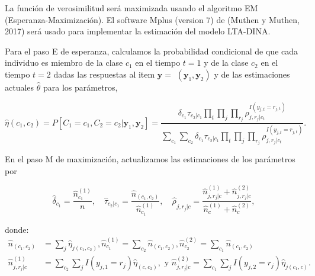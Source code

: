 	La función de verosimilitud será maximizada usando el algoritmo EM (Esperanza-Maximización). El software Mplus (version 7) de (Muthen y Muthen, 2017) será usado para implementar la estimación del modelo LTA-DINA.	
	
	
	Para el paso E de esperanza, calculamos la probabilidad condicional de que cada individuo es miembro de la clase ${ c }_{ 1 }$ en el tiempo $t=1$ y de la clase ${ c }_{ 2 }$ en el tiempo $t=2$ dadas las respuestas al item $\mathbf{y}=$ $\left(\mathbf{y}_{1}, \mathbf{y}_{2}\right)$ y de las estimaciones actuales $\hat{\theta}$ para los par\'{a}metros,
	
	\begin{equation}
		\hat{\eta}{\left(c_{1}, c_{2}\right)}=P\left[C_{1}=c_{1}, C_{2}= c_{2} | \mathbf{y}_{1}, \mathbf{y}_{2}\right]=\frac { \delta _{ c_{ 1 } }\tau_{c_2|c_1}\prod _{ t } \prod _{ j } \prod _{ r_{j} } \rho_{j,r_{j} | c_{t}}^{I\left(y_{j,t}=r_{j,t}\right)} } { \sum _{ c_{ 1 } } \sum _{ c_{ 2 } } \delta _{ c_{ 1 } }\tau _{c_2|c_1}\prod _{ t } \prod _{ j } \prod _{ r_{j} } \rho_{j,r_{j} | c_{t}}^{I\left(y_{j,t}=r_{j,t}\right)}}. \label{3.15}   
	\end{equation}
	
	En el paso M de maximizaci\'{o}n, actualizamos las estimaciones de los par\'{a}metros por
	
	\begin{equation}
		\hat{\delta}_{c_{1}}=\frac{\hat{n}_{c_{1}}^{(1)}}{n}, \quad \hat{\tau}_{c_{2} | c_{1}}=\frac{\hat{n}_{\left(c_{1}, c_{2}\right)}}{\hat{n}_{c_{1}}^{(1)}}, \quad \hat{\rho_{}}_{j,r_{j}| c}=\frac{\hat{n}_{j,r_{j} | c}^{(1)}+\hat{n}_{j,r_{j} | c}^{(2)}}{\hat{n}_{c}^{(1)}+\hat{n}_{c}^{(2)}} , \label{3.16}
	\end{equation}
	
	donde:
	\begin{align}
		\hat{n}_{\left( c_{1}, c_{2} \right)} & = \sum_{j} \hat{\eta}_{ j\left(c_{1}, c_{2}\right)},   \hat{n}_{c_{1}}^{(1)} = \sum_{c_{2}} \hat{n}_{\left(c_{1},  c_{2}\right)},  \hat{n}_{c_{2}}^{(2)} = \sum_{c_{1}} \hat{n}_{ \left( c_{1}, c_{2} \right)} \nonumber \\
		\hat{n}_{j,r_{j} \vert c}^{(1)} & = \sum_{c_{2}} \sum_{j} I\left( y_{j,1} = r_{j} \right) \hat{\eta}_{ \left( c, c_{2} \right) }, \mbox{ y } \hat{n}_{j,r_{j} \vert c }^{(2)}=\sum_{c_{1}} \sum_{j} I\left(y_{j,2}=r_{j}\right) \hat{\eta}_{j\left(c_{1}, c\right)} \nonumber.
	\end{align} 
	
